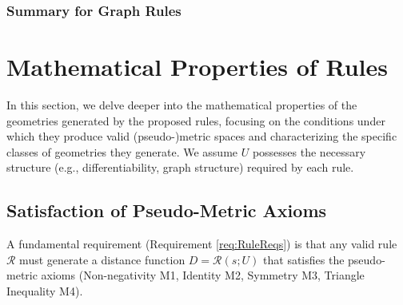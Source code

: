 \documentclass[twoside,twocolumn]{article}
\begin{document}
\subsubsection{Summary for Graph Rules}


\setcounter{equation}{0}
\section{Mathematical Properties of Rules}

In this section, we delve deeper into the mathematical properties of the geometries generated by the proposed rules, focusing on the conditions under which they produce valid (pseudo-)metric spaces and characterizing the specific classes of geometries they generate. We assume \( U \) possesses the necessary structure (e.g., differentiability, graph structure) required by each rule.

\newtheorem{proposition}{Proposition}[section] %

\subsection{Satisfaction of Pseudo-Metric Axioms}

A fundamental requirement (Requirement \ref{req:RuleReqs}) is that any valid rule \( \mathcal{R} \) must generate a distance function \( D = \mathcal{R}(s; U) \) that satisfies the pseudo-metric axioms (Non-negativity M1, Identity M2, Symmetry M3, Triangle Inequality M4).
\end{document}
